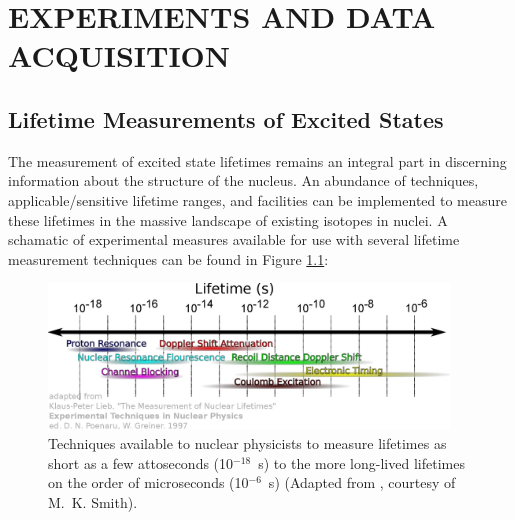 %
%

\chapter{EXPERIMENTS AND DATA ACQUISITION}

\section{Lifetime Measurements of Excited States}\label{sec:lifetime_measurement_techniques}
The measurement of excited state lifetimes remains an integral part in discerning information about the structure of the nucleus. An abundance of techniques, applicable/sensitive lifetime ranges, and facilities can be implemented to measure these lifetimes in the massive landscape of existing isotopes in nuclei. A schamatic of experimental measures available for use with several lifetime measurement techniques can be found in Figure \ref{fig:VariousLifetimeMeasurements}:

\begin{figure}[h!] 
\begin{center}
\includegraphics[width=0.95\textwidth]{lifetimes-techniques-full.eps}
\caption{Techniques available to nuclear physicists to measure lifetimes as short as a few attoseconds (10$^{-18}$~s) to the more long-lived lifetimes on the order of microseconds (10$^{-6}$~s) (Adapted from \cite{Poenaru_text}, courtesy of M.~K. Smith).}
\label{fig:VariousLifetimeMeasurements}
\end{center}
\end{figure}


